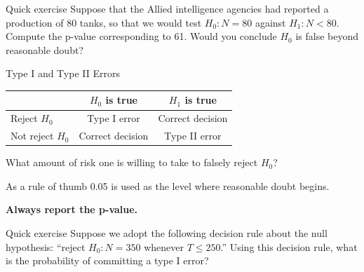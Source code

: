 \documentclass{beamer}
\begin{document}
\begin{frame}[t]{Quick exercise}
  Suppose that the Allied intelligence agencies had reported a production of 80
  tanks, so that we would test $H_0:N=80$ against $H_1:N<80$. Compute the
  p-value corresponding to 61. Would you conclude $H_0$ is false beyond
  reasonable doubt?
\end{frame}
  
\begin{frame}{Type I and Type II Errors}
  \begin{center}
    \begin{tabular}{l|cc}
      &$H_0$ is true&$H_1$ is true\\\hline
      Reject $H_0$&Type I error&Correct decision \\
      Not reject $H_0$&Correct decision&Type II error
    \end{tabular}
  \end{center}
  
  What amount of risk one is willing to take to falsely reject $H_0$?

  As a rule of thumb \alert{0.05} is used as the level where reasonable doubt
  begins.

  \begin{center}
    \textbf{\alert{Always report the p-value.}}
  \end{center}
\end{frame}

\begin{frame}[t]{Quick exercise}
  Suppose we adopt the following decision rule about the null hypothesis:
  ``reject $H_0:N=350$ whenever $T\leq 250$.'' Using this decision rule, what is
  the probability of committing a type I error?
\end{frame}
\end{document}
